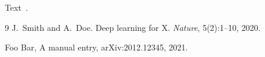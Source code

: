 \documentclass{article}
\begin{document}
Text~\cite{smith2020,manual}.
\begin{thebibliography}{9}
J.~Smith and A.~Doe.
\newblock Deep learning for {X}.
\newblock \emph{Nature}, 5(2):1--10, 2020.

Foo Bar, A manual entry, arXiv:2012.12345, 2021.
\end{thebibliography}
\end{document}
